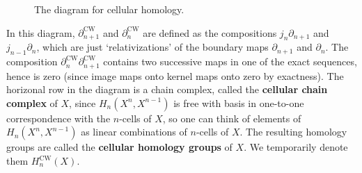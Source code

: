 \begin{figure}[H]
\centering
{}
\caption{The diagram for cellular homology.}
\label{celldiagram}
\end{figure}
In this diagram, $\partial _{n+1}^{\text{CW}}$ and $\partial _n^{\text{CW}} $ are defined as the compositions $j_n \partial _{n+1}$ and $j_{n-1}\partial _n $, which are just `relativizations' of the boundary maps $\partial _{n+1}$ and $\partial _n $. The composition $\partial _n ^{\text{CW}}\partial _{n+1}^{\text{CW}}$ contains two successive maps in one of the exact sequences, hence is zero (since image maps onto kernel maps onto zero by exactness). The horizonal row in the diagram is a chain complex, called the \textbf{cellular chain complex} of $X$, since $H_n (X^n ,X^{n-1})$ is free with basis in one-to-one correspondence with the $n$-cells of $X$, so one can think of elements of $H_n (X^n ,X^{n-1})$ as linear combinations of $n$-cells of $X$. The resulting homology groups are called the \textbf{cellular homology groups} of $X$. We temporarily denote them $H_n ^{\text{CW}}(X)$.
